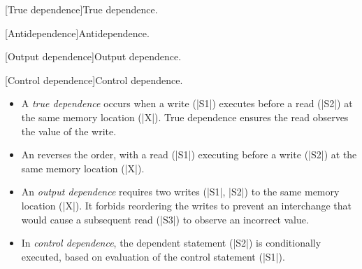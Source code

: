 \begin{center}
\begin{minipage}[t]{.4\textwidth}
\captionsetup{type=lstlisting}
[True dependence]{True dependence.}
\label{dep-true}
\end{minipage}\hspace{3em}
\begin{minipage}[t]{.4\textwidth}
\captionsetup{type=lstlisting}
[Antidependence]{Antidependence.}
\label{dep-anti}
\end{minipage}

\begin{minipage}[t]{.4\textwidth}
\captionsetup{type=lstlisting}
[Output dependence]{Output dependence.}
\label{dep-out}
\end{minipage}\hspace{3em}
\begin{minipage}[t]{.4\textwidth}
\captionsetup{type=lstlisting}
[Control dependence]{Control dependence.}
\label{dep-control}
\end{minipage}
\end{center}

\begin{itemize}
\item A \emph{true dependence}
occurs when a write (\pr|S1|) executes before a read (\pr|S2|) at the same memory location (\pr|X|).
True dependence ensures the read observes the value of the write.

\item An \emph{}
reverses the order,
with a read (\pr|S1|) executing before a write (\pr|S2|) at the same memory location (\pr|X|).

\item An \emph{output dependence}
requires two writes  (\pr|S1|, \pr|S2|) to the same memory location (\pr|X|).
It forbids reordering the writes to prevent an interchange that would cause a subsequent read (\pr|S3|) to observe an incorrect value.

\item In \emph{control dependence}, the dependent statement (\pr|S2|) is conditionally executed,
based on evaluation of the control statement (\pr|S1|).
\end{itemize}

